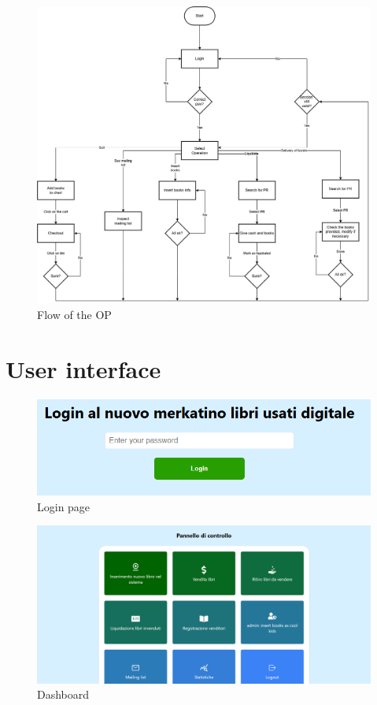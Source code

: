 \begin{figure}[ht]
    \centering
    \includegraphics[width=\textwidth]{assets/flow_op.png}
    \caption{Flow of the OP}
    \label{fig:flow_op}
\end{figure}

\section{User interface}
\label{sec:ui}

\begin{figure}[ht]
    \centering
    \includegraphics[width=.5\textwidth]{assets/ui_mockup/login.png}
    \caption{Login page}
    \label{fig:login}
\end{figure}

\begin{figure}[ht]
    \centering
    \includegraphics[width=.75\textwidth]{assets/ui_mockup/dashboard.png}
    \caption{Dashboard}
    \label{fig:dashboard}
\end{figure}

